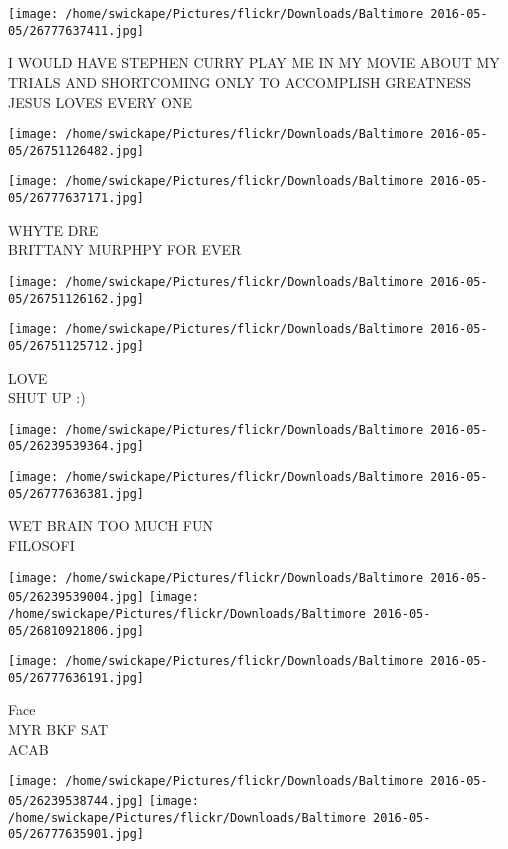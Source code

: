 \documentclass[10pt,letterpaper]{article}
\begin{document}
\vspace{0.25in}
\texttt{[image: /home/swickape/Pictures/flickr/Downloads/Baltimore 2016-05-05/26777637411.jpg]}

I WOULD HAVE STEPHEN CURRY PLAY ME IN MY MOVIE ABOUT MY TRIALS AND SHORTCOMING ONLY TO ACCOMPLISH GREATNESS\\
JESUS LOVES EVERY ONE
\pagebreak

\texttt{[image: /home/swickape/Pictures/flickr/Downloads/Baltimore 2016-05-05/26751126482.jpg]}

\vspace{0.25in}
\texttt{[image: /home/swickape/Pictures/flickr/Downloads/Baltimore 2016-05-05/26777637171.jpg]}

WHYTE DRE\\
BRITTANY MURPHPY FOR EVER
\pagebreak

\texttt{[image: /home/swickape/Pictures/flickr/Downloads/Baltimore 2016-05-05/26751126162.jpg]}

\vspace{0.25in}
\texttt{[image: /home/swickape/Pictures/flickr/Downloads/Baltimore 2016-05-05/26751125712.jpg]}

LOVE\\
SHUT UP :)
\pagebreak

\texttt{[image: /home/swickape/Pictures/flickr/Downloads/Baltimore 2016-05-05/26239539364.jpg]}

\vspace{0.25in}
\texttt{[image: /home/swickape/Pictures/flickr/Downloads/Baltimore 2016-05-05/26777636381.jpg]}

WET BRAIN TOO MUCH FUN\\
FILOSOFI
\pagebreak

\texttt{[image: /home/swickape/Pictures/flickr/Downloads/Baltimore 2016-05-05/26239539004.jpg]}
\texttt{[image: /home/swickape/Pictures/flickr/Downloads/Baltimore 2016-05-05/26810921806.jpg]}

\vspace{0.25in}
\texttt{[image: /home/swickape/Pictures/flickr/Downloads/Baltimore 2016-05-05/26777636191.jpg]}

Face\\
MYR BKF SAT\\
ACAB
\pagebreak

\texttt{[image: /home/swickape/Pictures/flickr/Downloads/Baltimore 2016-05-05/26239538744.jpg]}
\texttt{[image: /home/swickape/Pictures/flickr/Downloads/Baltimore 2016-05-05/26777635901.jpg]}
\end{document}

